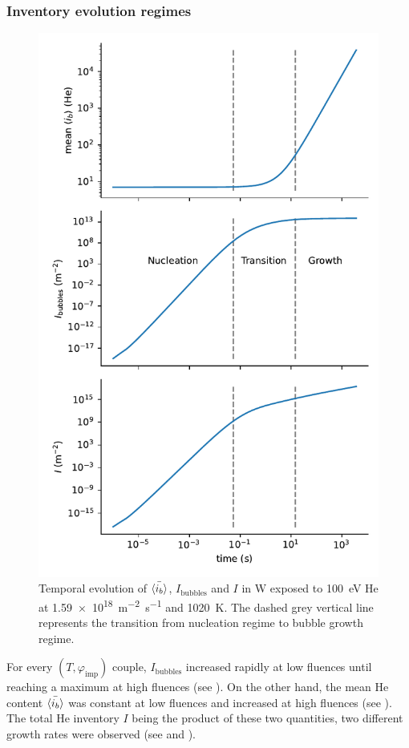 \subsubsection{Inventory evolution regimes} 

\begin{figure} [h!]
    \centering
    \includegraphics[width=0.75\linewidth]{Figures/Chapter4/parametric study/inventory_bubbles_ib.pdf}
    \caption{Temporal evolution of $\Bar{\langle i_b \rangle}$, $I_\mathrm{bubbles}$ and $I$ in W exposed to \SI{100}{eV} He at \SI{1.59e18}{m^{-2}.s^{-1}} and \SI{1020}{K}. The dashed grey vertical line represents the transition from nucleation regime to bubble growth regime.}
\end{figure}

For every $(T, \varphi_\mathrm{imp})$ couple, $I_\mathrm{bubbles}$ increased rapidly at low \glspl{fluence} until reaching a maximum at high \glspl{fluence} (see ).
On the other hand, the mean \gls{He} content $\Bar{\langle i_b \rangle}$ was constant at low \glspl{fluence} and increased at high \glspl{fluence} (see ).
The total \gls{He} \gls{inventory} $I$ being the product of these two quantities, two different growth rates were observed (see  and ).

